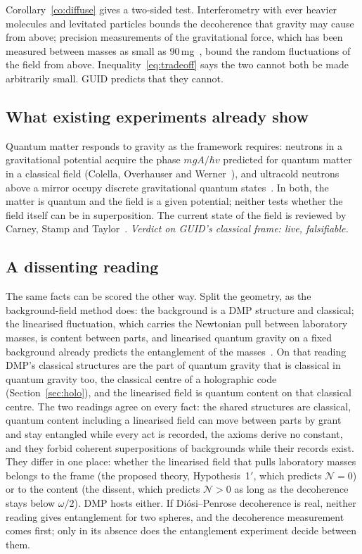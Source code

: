 Corollary~\ref{co:diffuse} gives a two-sided test. Interferometry with ever heavier molecules and levitated particles bounds the decoherence
that gravity may cause from above; precision measurements of the gravitational force, which has been measured between masses as small as
90\,mg~\cite{westphal}, bound the random fluctuations of the field from above. Inequality~\eqref{eq:tradeoff} says the two cannot both be
made arbitrarily small. GUID predicts that they cannot.

\subsection{What existing experiments already show}

Quantum matter responds to gravity as the framework requires: neutrons in a gravitational potential acquire the phase $mgA/\hbar v$
predicted for quantum matter in a classical field (Colella, Overhauser and Werner~\cite{cow}), and ultracold neutrons above a mirror occupy
discrete gravitational quantum states~\cite{nesvizhevsky}. In both, the matter is quantum and the field is a given potential; neither tests
whether the field itself can be in superposition. The current state of the field is reviewed by Carney, Stamp and Taylor~\cite{cst}.
\emph{Verdict on GUID's classical frame: live, falsifiable.}

\subsection{A dissenting reading}\label{sec:dissent}

The same facts can be scored the other way. Split the geometry, as the
background-field method does: the background is a DMP structure and classical; the linearised fluctuation, which carries the Newtonian
pull between laboratory masses, is content between parts, and linearised quantum gravity on a fixed background already predicts the
entanglement of the masses~\cite{christodoulou23}. On that reading DMP's classical structures are the part of quantum gravity that is
classical in quantum gravity too, the classical centre of a holographic code (Section~\ref{sec:holo}), and the linearised field is quantum content on that classical
centre. The two readings agree on every fact: the shared structures are classical, quantum content including a linearised field can
move between parts by grant and stay entangled while every act is recorded, the axioms derive no constant, and they forbid coherent
superpositions of backgrounds while their records exist. They differ in one place: whether the linearised field that pulls laboratory
masses belongs to the frame (the proposed theory, Hypothesis~1$'$, which predicts $\mathcal N=0$) or to the content (the dissent,
which predicts $\mathcal N>0$ as long as the decoherence stays below $\omega/2$). DMP hosts either. If Di\'osi--Penrose decoherence is
real, neither reading gives entanglement for two spheres, and the decoherence measurement comes first; only in its absence does the
entanglement experiment decide between them.


